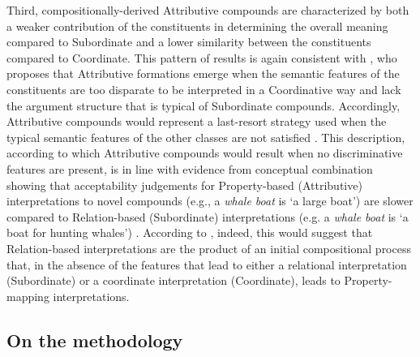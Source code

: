 \documentclass[output=paper]{langsci/langscibook}
\begin{document}
Third, compositionally-derived Attributive compounds are characterized by both a weaker contribution of the constituents in determining the overall meaning compared to Subordinate and a lower similarity between the constituents compared to Coordinate. This pattern of results is again consistent with \cite{lieber5OHC}, who proposes that Attributive formations emerge when the semantic
features of the constituents are too disparate to be interpreted in a Coordinative way and lack the argument structure that is typical of Subordinate compounds. Accordingly, Attributive compounds would represent a last-resort strategy used when the typical semantic features of the other classes are not satisfied \citep{lieber5OHC}. This description, according to which Attributive compounds would result when no discriminative features are present, is in line with evidence from conceptual combination showing that acceptability judgements for Property-based (Attributive) interpretations to novel compounds (e.g., a \emph{whale boat} is `a large boat’) are slower compared to Relation-based (Subordinate) interpretations (e.g. a \emph{whale boat} is `a boat for hunting whales') \citep{gagne2000}. According to \cite{gagne2015}, indeed, this would suggest that Relation-based interpretations are the product of an initial compositional process that, in the absence of the features that lead to either a relational interpretation (Subordinate) or a coordinate interpretation (Coordinate), leads to Property-mapping interpretations.

\subsection{On the methodology}
\end{document}
